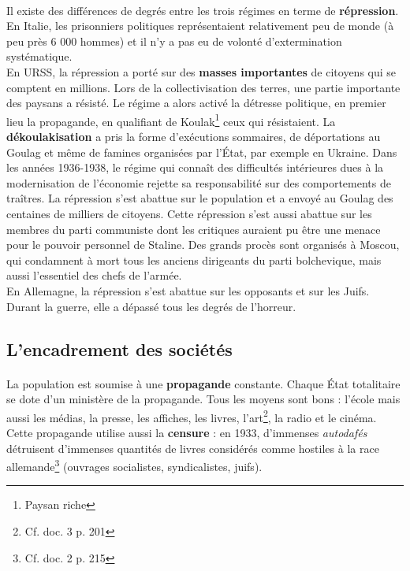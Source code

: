 \documentclass[12pt]{article}
\renewcommand{\emph}{\textbf}
\begin{document}
\paragraph{}
Il existe des différences de degrés entre les trois régimes en terme de \emph{répression}. En Italie, les prisonniers politiques représentaient relativement peu de monde (à peu près 6 000 hommes) et il n'y a pas eu de volonté d'extermination systématique.\\
En URSS, la répression a porté sur des \emph{masses importantes} de citoyens qui se comptent en millions. Lors de la collectivisation des terres, une partie importante des paysans a résisté. Le régime a alors activé la détresse politique, en premier lieu la propagande, en qualifiant de Koulak\footnote{Paysan riche} ceux qui résistaient. La \emph{dékoulakisation} a pris la forme d'exécutions sommaires, de déportations au Goulag et même de famines organisées par l'État, par exemple en Ukraine. Dans les années 1936-1938, le régime qui connaît des difficultés intérieures dues à la modernisation de l'économie rejette sa responsabilité sur des comportements de traîtres. La répression s'est abattue sur le population et a envoyé au Goulag des centaines de milliers de citoyens. Cette répression s'est aussi abattue sur les membres du parti communiste dont les critiques auraient pu être une menace pour le pouvoir personnel de Staline. Des grands procès sont organisés à Moscou, qui condamnent à mort tous les anciens dirigeants du parti bolchevique, mais aussi l'essentiel des chefs de l'armée.\\
En Allemagne, la répression s'est abattue sur les opposants et sur les Juifs. Durant la guerre, elle a dépassé tous les degrés de l'horreur.

\subsection{L'encadrement des sociétés}

\paragraph{}
La population est soumise à une \emph{propagande} constante. Chaque État totalitaire se dote d'un ministère de la propagande. Tous les moyens sont bons : l'école mais aussi les médias, la presse, les affiches, les livres, l'art\footnote{Cf. doc. 3 p. 201}, la radio et le cinéma. Cette propagande utilise aussi la \emph{censure} : en 1933, d'immenses \textit{autodafés} détruisent d'immenses quantités de livres considérés comme hostiles à la race allemande\footnote{Cf. doc. 2 p. 215} (ouvrages socialistes, syndicalistes, juifs).
\end{document}
